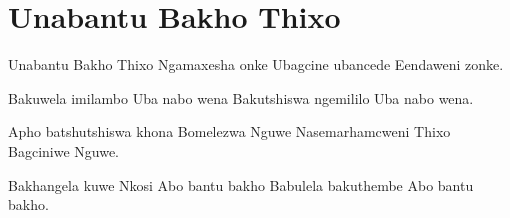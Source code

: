 \starttocol
\chapter{Unabantu Bakho Thixo}
\nexttocol
\hfill{\it }
\stoptocol
\starttocol
\startlines
{\sc Unabantu} Bakho Thixo
Ngamaxesha onke
Ubagcine ubancede
Eendaweni zonke.

Bakuwela imilambo
Uba nabo wena
Bakutshiswa ngemililo
Uba nabo wena.

Apho batshutshiswa khona
Bomelezwa Nguwe
Nasemarhamcweni Thixo
Bagciniwe Nguwe.

Bakhangela kuwe Nkosi
Abo bantu bakho
Babulela bakuthembe
Abo bantu bakho.
\stoplines
\nexttocol

\stoptocol
